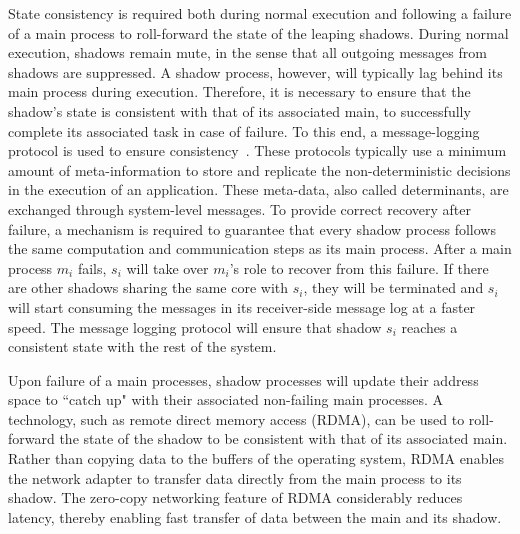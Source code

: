 %



State consistency is required both during normal execution and following a failure of a main process to roll-forward the state of the leaping shadows. During normal execution, shadows remain mute, in the sense that 
all outgoing messages from shadows are suppressed. 
A shadow process, however, will typically lag behind its main process during execution. Therefore, it is necessary to ensure that the shadow's state is consistent with that of its associated main, to successfully complete its associated task in case of failure. To this end, a message-logging protocol is used to ensure consistency~\cite{Marz}. These protocols typically use a minimum amount of meta-information to store and replicate the non-deterministic decisions in the execution of an application.  These meta-data, also called determinants, are exchanged through system-level messages. To provide correct recovery after failure, 
a mechanism is required to guarantee that every shadow process follows the same computation and communication steps as its main process. 
After a main process $m_i$ fails, $s_i$ will take over $m_i$'s role to recover from this failure. If there are other shadows sharing the same core with $s_i$, they will be terminated and $s_i$ will start consuming the messages in its receiver-side message log at a faster speed. The message logging protocol will ensure that shadow $s_i$ reaches a consistent state with the rest of the system. 

Upon failure of a main processes, shadow processes will update their address space to ``catch up" with their associated non-failing main processes. A technology, such as remote direct memory access (RDMA), can be used to roll-forward the state of the shadow to be consistent with that of its associated main. Rather than copying data to the buffers of the operating system, RDMA enables the network adapter to transfer data directly from the main process to its shadow. The zero-copy networking feature of RDMA considerably reduces latency, thereby enabling fast transfer of data between the main and its shadow.

 



